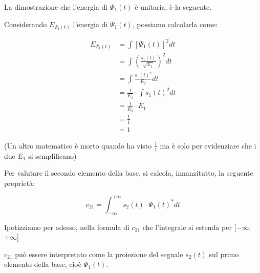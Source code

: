 \begin{tcolorbox}
    La dimostrazione che l'energia di $\Psi_1 (t)$ è unitaria, è la seguente. \newline 

    Considerando $E_{\Psi_1 (t)}$ l'energia di $\Psi_1 (t)$, possiamo calcolarla come: 

    {
        \Large 
        \begin{equation}
            \begin{split}
                E_{\Psi_1 (t)}
                &= 
                \int \left[ \Psi_1 (t) \right]^{2} dt
                \\
                &=
                \int \left( \frac{s_1 (t)}{\sqrt{E_1}}\right)^{2} dt
                \\
                &= 
                \int \frac{s_1 (t) ^{2}}{E_1} dt
                \\
                &=
                \frac{1}{E_1} \cdot \int s_1 (t) ^{2} dt 
                \\
                &= 
                \frac{1}{E_1} \cdot E_1 
                \\
                &= 
                \frac{1}{1}
                \\
                &= 
                1
            \end{split}
        \end{equation}
    }

    (Un altro matematico è morto quando ha visto $\frac{1}{1}$ ma è solo per evidenziare che i due $E_1$ si semplificano)
\end{tcolorbox}

Per valutare il secondo elemento della base, si calcola, innanzitutto, la seguente proprietà: 

{
    \Large 
    \begin{equation}
        c_{21} 
        = 
        \int_{- \infty}^{+ \infty} 
        s_2 (t) \cdot \Psi_1 (t) ^{*} dt
    \end{equation}
}

\begin{tcolorbox}
    Ipotizziamo per adesso, nella formula di $c_{21}$ che l'integrale si estenda per [$-\infty$, $+\infty$] 
\end{tcolorbox}

$c_{21}$ può essere interpretato come la proiezione del segnale $s_2 (t)$ sul primo elemento della base, cioè $\Psi_1 (t)$. \newline 


